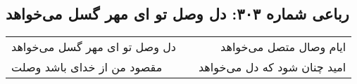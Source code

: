 \begin{center}
\section*{رباعی شماره ۳۰۳: دل وصل تو ای مهر گسل می‌خواهد}
\label{sec:sh303}
\begin{longtable}{l p{0.5cm} r}
دل وصل تو ای مهر گسل می‌خواهد
&&
ایام وصال متصل می‌خواهد
\\
مقصود من از خدای باشد وصلت
&&
امید چنان شود که دل می‌خواهد
\\
\end{longtable}
\end{center}

